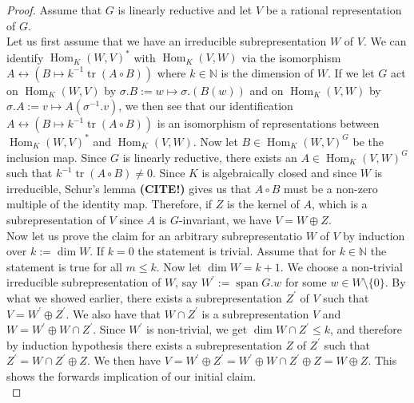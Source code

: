 \begin{proof}
  Assume that $G$ is linearly reductive and let $V$ be a rational representation of $G$.\\
  Let us first assume that we have an irreducible subrepresentation $W$ of $V$.
  We can identify $\operatorname{Hom}_K(W,V)^\ast$ with $\operatorname{Hom}_K(V,W)$ via the isomorphism  $A \leftrightarrow (B \mapsto k^{-1}\operatorname{tr}(A \circ B))$ where $k \in \mathbb{N}$ is the dimension of $W$.
  If we let $G$ act on $ \operatorname{Hom}_K(W,V)$ by $ \sigma.B :=  w \mapsto \sigma . (B(w))$ and on $\operatorname{Hom}_K(V,W)$ by $ \sigma.A := v \mapsto A(\sigma^{-1}.v) $, we then see that our identification $A \leftrightarrow (B \mapsto k^{-1}\operatorname{tr}(A \circ B))$ is an isomorphism of representations between $\operatorname{Hom}_K(W,V)^\ast$ and $\operatorname{Hom}_K(V,W)$. %
  Now let $B \in \operatorname{Hom}_K(W,V)^G$ be the inclusion map.
  Since $G$ is linearly reductive, there exists an $A \in \operatorname{Hom}_K(V,W)^G$ such that $k^{-1} \operatorname{tr}(A \circ B) \neq 0$.
  Since $K$ is algebraically closed and since $W$ is irreducible, Schur's lemma \textbf{(CITE!)} gives us that $A \circ B$ must be a non-zero multiple of the identity map.
  Therefore, if $Z$ is the kernel of $A$, which is a subrepresentation of $V$ since $A$ is $G$-invariant, we have $V = W \oplus Z$.\\
  Now let us prove the claim for an arbitrary subrepresentatio $W$ of $V$ by induction over $k := \operatorname{dim}W$.
  If $k=0$ the statement is trivial.
  Assume that for $k \in \mathbb{N}$ the statement is true for all $m \leq k$.
  Now let $\operatorname{dim}W = k +1$.
  We choose a non-trivial irreducible subrepresentation of $W$, say $W^\prime := \operatorname{span}G.w$ for some $w \in W \setminus \{0\}$.
  By what we showed earlier, there exists a subrepresentation $Z^\prime$ of $V$ such that $V = W^\prime \oplus Z^\prime$.
  We also have that $W \cap Z^\prime$ is a subrepresentation $V$ and $W = W^\prime \oplus W \cap Z^\prime$.
  Since $W^\prime$ is non-trivial, we get $\operatorname{dim} W \cap Z^\prime \leq k$, and therefore by induction hypothesis there exists a subrepresentation $Z$ of $Z^\prime$ such that $Z^\prime = W \cap Z^\prime \oplus Z$.
  We then have $V = W^\prime \oplus Z^\prime = W^\prime \oplus W \cap Z^\prime \oplus Z = W \oplus Z$.
  This shows the forwards implication of our initial claim.\\  

\end{proof}
